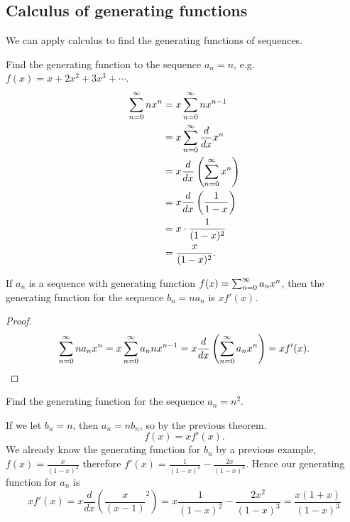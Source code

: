 \documentclass[10pt, a4paper]{article}
\begin{document}
\subsection{Calculus of generating functions}
We can apply calculus to find the generating functions of sequences.

\begin{example}
    Find the generating function to the sequence $a_n = n$,
    e.g.
    $f(x) = x + 2x ^ 2 + 3x ^ 3 + \dotsi$.
    \begin{align*}
        \infsum[n = 0]nx ^ n &= x\infsum[n = 0]nx ^ {n - 1} \\
        &= x\infsum[n = 0]\frac{d}{dx}{x ^ n} \\
        &= x\frac{d}{dx}\left(\infsum[n = 0]x ^ n\right) \\
        &= x\frac{d}{dx}\left(\frac{1}{1 - x}\right) \\
        &= x \cdot \frac{1}{(1 - x) ^ 2} \\
        &= \frac{x}{(1 - x) ^ 2}.
    \end{align*}
\end{example}

\begin{theorem}
    If $a_n$ is a sequence with generating function $f(x) = \infsum[n = 0]a_nx ^ n$,
    then the generating function for the sequence $b_n = na_n$ is $xf'(x)$.
    \begin{proof}
        \[
        \infsum[n = 0]na_nx ^ n = x\infsum[n = 0]a_nnx ^ {n - 1} = x\frac{d}{dx}\left(\infsum[n = 0]a_nx ^ n\right) = xf'(x).
        \]
    \end{proof}
\end{theorem}

\begin{example}
    Find the generating function for the sequence $a_n = n ^ 2$.
    
    If we let $b_n = n$,
    then $a_n = nb_n$,
    so by the previous theorem.
    \[
    f(x) = xf'(x).
    \]
    We already know the generating function for $b_n$ by a previous example,
    $f(x) = \frac{x}{(1 - x) ^ 2}$ therefore $f'(x) = \frac{1}{(1 - x) ^ 2} - \frac{2x}{(1 - x) ^ 3}$.
    Hence our generating function for $a_n$ is
    \[
    xf'(x) = x\frac{d}{dx}\left(\frac{x}{(x - 1)} ^ 2\right) = x\frac{1}{(1 - x) ^ 2} - \frac{2x ^ 2}{(1 - x) ^ 3} = \frac{x(1 + x)}{(1 - x) ^ 3}
    \]
\end{example}
\end{document}
